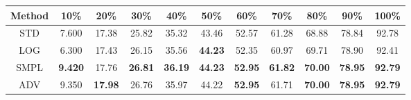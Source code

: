 \documentclass{standalone}
\begin{document}
\begin{tabular}{c|cccccccccc}
      \toprule
      Method & 10\% & 20\% & 30\% & 40\% & 50\% & 60\% & 70\% & 80\% & 90\% & 100\% \\
      \midrule
STD & 7.600 & 17.38 & 25.82 & 35.32 & 43.46 & 52.57 & 61.28 & 68.88 & 78.84 & 92.78\\
LOG & 6.300 & 17.43 & 26.15 & 35.56 & \textbf{44.23} & 52.35 & 60.97 & 69.71 & 78.90 & 92.41\\
SMPL & \textbf{9.420} & 17.76 & \textbf{26.81} & \textbf{36.19} & \textbf{44.23} & \textbf{52.95} & \textbf{61.82} & \textbf{70.00} & \textbf{78.95} & \textbf{92.79}\\
ADV & 9.350 & \textbf{17.98} & 26.76 & 35.97 & 44.22 & \textbf{52.95} & 61.71 & \textbf{70.00} & \textbf{78.95} & \textbf{92.79}\\
  \bottomrule
\end{tabular}
\end{document}
